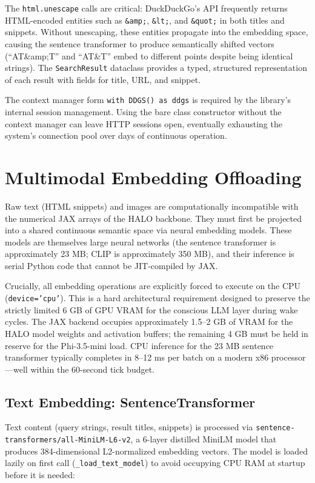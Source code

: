 The \texttt{html.unescape} calls are critical: DuckDuckGo's API frequently returns HTML-encoded entities such as \texttt{\&amp;}, \texttt{\&lt;}, and \texttt{\&quot;} in both titles and snippets. Without unescaping, these entities propagate into the embedding space, causing the sentence transformer to produce semantically shifted vectors (``AT\&amp;T'' and ``AT\&T'' embed to different points despite being identical strings). The \texttt{SearchResult} dataclass provides a typed, structured representation of each result with fields for title, URL, and snippet.

The context manager form \texttt{with DDGS() as ddgs} is required by the library's internal session management. Using the bare class constructor without the context manager can leave HTTP sessions open, eventually exhausting the system's connection pool over days of continuous operation.

\section{Multimodal Embedding Offloading}

Raw text (HTML snippets) and images are computationally incompatible with the numerical JAX arrays of the HALO backbone. They must first be projected into a shared continuous semantic space via neural embedding models. These models are themselves large neural networks (the sentence transformer is approximately 23 MB; CLIP is approximately 350 MB), and their inference is serial Python code that cannot be JIT-compiled by JAX.

Crucially, all embedding operations are explicitly forced to execute on the CPU (\texttt{device='cpu'}). This is a hard architectural requirement designed to preserve the strictly limited 6 GB of GPU VRAM for the conscious LLM layer during wake cycles. The JAX backend occupies approximately 1.5--2 GB of VRAM for the HALO model weights and activation buffers; the remaining 4 GB must be held in reserve for the Phi-3.5-mini load. CPU inference for the 23 MB sentence transformer typically completes in 8--12 ms per batch on a modern x86 processor---well within the 60-second tick budget.

\subsection{Text Embedding: SentenceTransformer}

Text content (query strings, result titles, snippets) is processed via \texttt{sentence-transformers/all-MiniLM-L6-v2}, a 6-layer distilled MiniLM model that produces 384-dimensional L2-normalized embedding vectors. The model is loaded lazily on first call (\texttt{\_load\_text\_model}) to avoid occupying CPU RAM at startup before it is needed:

